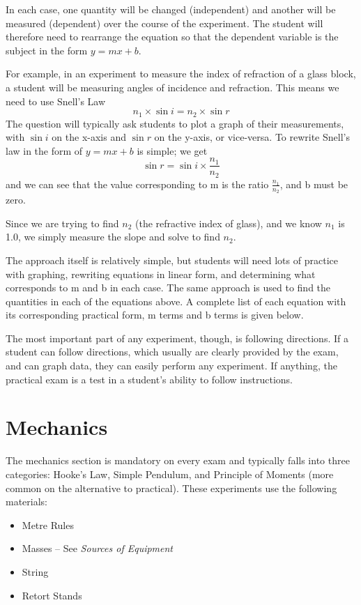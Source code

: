 \documentclass[12pt,a4paper]{report}
\begin{document}
In each case, one quantity will be changed (independent) and another will be
measured (dependent) over the course of the experiment. The student will therefore need
to rearrange the equation so that the dependent variable is the subject in the form $y = mx + b$.

For example, in an experiment to measure the index of refraction of a glass block, a
student will be measuring angles of incidence and refraction. This means we need to use
Snell’s Law $$n_1 \times \sin{i} = n_2 \times \sin{r}$$
The question will typically ask students to plot a graph of their measurements, with $\sin{i}$
on the x-axis and $\sin{r}$ on the y-axis, or vice-versa. To rewrite Snell’s law in the form of
$y = mx + b$ is simple; we get $$\sin{r} = \sin{i} \times \frac{n_1}{n_2}$$
and we can see that the value corresponding to m is the ratio $\frac{n_1}{n_2}$, and b must be zero.

Since we are trying to find $n_2$ (the refractive index of glass), and we know $n_1$ is 1.0, we
simply measure the slope and solve to find $n_2$.

The approach itself is relatively simple, but students will need lots of practice
with graphing, rewriting equations in linear form, and determining what corresponds to m
and b in each case. The same approach is used to find the quantities in each of the
equations above. A complete list of each equation with its corresponding practical form,
m terms and b terms is given below.


The most important part of any experiment, though, is following directions. If a
student can follow directions, which usually are clearly provided by the exam, and can
graph data, they can easily perform any experiment. If anything, the practical exam is a
test in a student’s ability to follow instructions.

\section{Mechanics}

The mechanics section is mandatory on every exam and typically falls into three
categories: Hooke’s Law, Simple Pendulum, and Principle of Moments (more common
on the alternative to practical). These experiments use the following materials:
\begin{itemize}
\item{Metre Rules}
\item{Masses – See \textit{Sources of Equipment}}
\item{String}
\item{Retort Stands}
\end{itemize}
\end{document}
